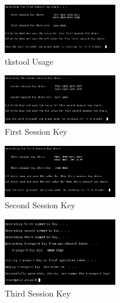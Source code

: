 \documentclass[12pt]{report}
\begin{document}
\begin{itemize}
\begin{itemize}
\begin{itemize}
\begin{figure}[H]
                            \end{figure}
                            \begin{figure}[H]
                                \centering
                                \includegraphics[width=50mm]{Images/tkstool-create-sharedSecret2.png}
                                \caption{tkstool Usage}
                            \end{figure}
                            \begin{figure}[H]
                                \centering
                                \includegraphics[width=50mm]{Images/tkstool-create-sharedSecret3.png}
                                \caption{First Session Key}
                            \end{figure}
                            \begin{figure}[H]
                                \centering
                                \includegraphics[width=50mm]{Images/tkstool-create-sharedSecret4.png}
                                \caption{Second Session Key}
                            \end{figure}
                            \begin{figure}[H]
                                \centering
                                \includegraphics[width=50mm]{Images/tkstool-create-sharedSecret5.png}
                                \caption{Third Session Key}

\end{figure}
\end{itemize}
\end{itemize}
\end{itemize}
\end{document}

